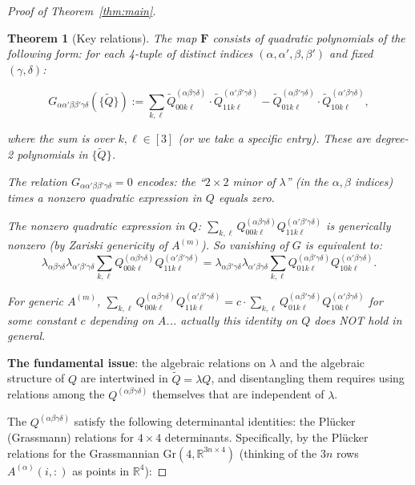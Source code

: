 \documentclass[12pt]{article}
\newtheorem{theorem}{Theorem}
\theoremstyle{definition}
\begin{document}
\begin{proof}[Proof of Theorem~\ref{thm:main}]
\begin{theorem}[Key relations]
The map $\mathbf{F}$ consists of quadratic polynomials of the following form: for each 4-tuple of distinct indices $(\alpha,\alpha',\beta,\beta')$ and fixed $(\gamma,\delta)$:

\begin{equation}\label{eq:F-correct}
G_{\alpha\alpha'\beta\beta'\gamma\delta}(\{\tilde{Q}\}) := \sum_{k,\ell}\tilde{Q}^{(\alpha\beta\gamma\delta)}_{00k\ell}\cdot\tilde{Q}^{(\alpha'\beta'\gamma\delta)}_{11k\ell} - \tilde{Q}^{(\alpha\beta'\gamma\delta)}_{01k\ell}\cdot\tilde{Q}^{(\alpha'\beta\gamma\delta)}_{10k\ell},
\end{equation}

where the sum is over $k,\ell\in[3]$ (or we take a specific entry). These are degree-2 polynomials in $\{\tilde{Q}\}$.

The relation $G_{\alpha\alpha'\beta\beta'\gamma\delta} = 0$ encodes: the ``$2\times 2$ minor of $\lambda$'' (in the $\alpha,\beta$ indices) times a nonzero quadratic expression in $Q$ equals zero.

The nonzero quadratic expression in $Q$: $\sum_{k,\ell}Q^{(\alpha\beta\gamma\delta)}_{00k\ell}Q^{(\alpha'\beta'\gamma\delta)}_{11k\ell}$ is generically nonzero (by Zariski genericity of $A^{(m)}$). So vanishing of $G$ is equivalent to:
$$\lambda_{\alpha\beta\gamma\delta}\lambda_{\alpha'\beta'\gamma\delta}\sum_{k,\ell}Q^{(\alpha\beta\gamma\delta)}_{00k\ell}Q^{(\alpha'\beta'\gamma\delta)}_{11k\ell} = \lambda_{\alpha\beta'\gamma\delta}\lambda_{\alpha'\beta\gamma\delta}\sum_{k,\ell}Q^{(\alpha\beta'\gamma\delta)}_{01k\ell}Q^{(\alpha'\beta\gamma\delta)}_{10k\ell}.$$

For generic $A^{(m)}$, $\sum_{k,\ell}Q^{(\alpha\beta\gamma\delta)}_{00k\ell}Q^{(\alpha'\beta'\gamma\delta)}_{11k\ell} = c\cdot\sum_{k,\ell}Q^{(\alpha\beta'\gamma\delta)}_{01k\ell}Q^{(\alpha'\beta\gamma\delta)}_{10k\ell}$ for some constant $c$ depending on $A$... actually this identity on $Q$ does NOT hold in general.

\end{theorem}

\textbf{The fundamental issue}: the algebraic relations on $\lambda$ and the algebraic structure of $Q$ are intertwined in $\tilde{Q} = \lambda Q$, and disentangling them requires using relations among the $Q^{(\alpha\beta\gamma\delta)}$ themselves that are independent of $\lambda$.

The $Q^{(\alpha\beta\gamma\delta)}$ satisfy the following determinantal identities: the Plücker (Grassmann) relations for $4\times 4$ determinants. Specifically, by the Plücker relations for the Grassmannian $\mathrm{Gr}(4, \mathbb{R}^{3n\times 4})$ (thinking of the $3n$ rows $A^{(\alpha)}(i,:)$ as points in $\mathbb{R}^4$):


\end{proof}
\end{document}
